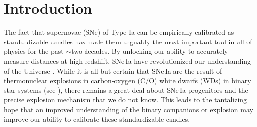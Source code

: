 \documentclass[twocolumn]{./aastex63}
\begin{document}

\vspace{1em}

\section{Introduction}\label{sec:intro}

The fact that supernovae (SNe) of Type Ia can be empirically calibrated as
standardizable candles has made them arguably the most important tool in all of
physics for the past $\sim$two decades. By unlocking our ability to accurately
measure distances at high redshift, SNe\,Ia have revolutionized our
understanding of the Universe \citep{Riess98,Perlmutter99}. While it is all
but certain that SNe\,Ia are the result of thermonuclear explosions in
carbon-oxygen (C/O) white dwarfs (WDs) in binary star systems (see
\citealt{Maoz14,Livio18}), there remains a great deal about SNe\,Ia progenitors
and the precise explosion mechanism that we do not know. This leads to the
tantalizing hope that an improved understanding of the binary companions or
explosion may improve our ability to calibrate these standardizable candles.
\end{document}
